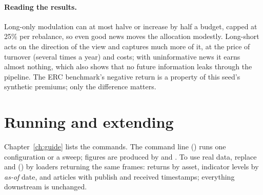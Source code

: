 \paragraph{Reading the results.} Long-only modulation can at most halve or increase by half a budget, capped at
25\% per rebalance, so even good news moves the allocation modestly. Long-short acts on the direction of the view
and captures much more of it, at the price of turnover (several times a year) and costs; with uninformative news it
earns almost nothing, which also shows that no future information leaks through the pipeline. The ERC benchmark's
negative return is a property of this seed's synthetic premiums; only the difference matters.

\section{Running and extending}
Chapter~\ref{ch:guide} lists the commands. The command line () runs one configuration or a sweep;
figures are produced by  and . To use real data, replace
 and  () by loaders returning the same
frames: returns by asset, indicator levels by \emph{as-of} date, and articles with publish and received
timestamps; everything downstream is unchanged.
